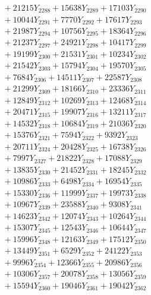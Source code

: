\documentclass[a4paper,10pt]{article}
\begin{document}
{\begin{align}
&\;  + 21215 Y_{2288} + 15638 Y_{2289} + 17103 Y_{2290} \\[0.3ex]
&\;  + 10044 Y_{2291} + 7770 Y_{2292} + 17617 Y_{2293} \\[0.3ex]
&\;  + 21987 Y_{2294} + 10756 Y_{2295} + 18364 Y_{2296} \\[0.3ex]
&\;  + 21237 Y_{2297} + 24921 Y_{2298} + 10417 Y_{2299} \\[0.3ex]
&\;  + 19199 Y_{2300} + 21531 Y_{2301} + 10234 Y_{2302} \\[0.3ex]
&\;  + 21542 Y_{2303} + 15794 Y_{2304} + 19570 Y_{2305} \\[0.3ex]
&\;  + 7684 Y_{2306} + 14511 Y_{2307} + 22587 Y_{2308} \\[0.5ex]\allowbreak
&\;  + 21299 Y_{2309} + 18166 Y_{2310} + 23336 Y_{2311} \\[0.3ex]
&\;  + 12849 Y_{2312} + 10269 Y_{2313} + 12468 Y_{2314} \\[0.3ex]
&\;  + 20471 Y_{2315} + 19907 Y_{2316} + 13211 Y_{2317} \\[0.3ex]
&\;  + 14532 Y_{2318} + 10684 Y_{2319} + 21036 Y_{2320} \\[0.3ex]
&\;  + 15376 Y_{2321} + 7594 Y_{2322} + 9392 Y_{2323} \\[0.3ex]
&\;  + 20711 Y_{2324} + 20428 Y_{2325} + 16738 Y_{2326} \\[0.3ex]
&\;  + 7997 Y_{2327} + 21822 Y_{2328} + 17088 Y_{2329} \\[0.3ex]
&\;  + 13835 Y_{2330} + 21452 Y_{2331} + 18245 Y_{2332} \\[0.3ex]
&\;  + 10986 Y_{2333} + 6498 Y_{2334} + 16954 Y_{2335} \\[0.3ex]
&\;  + 15330 Y_{2336} + 11999 Y_{2337} + 19973 Y_{2338} \\[0.5ex]\allowbreak
&\;  + 10967 Y_{2339} + 23588 Y_{2340} + 9308 Y_{2341} \\[0.3ex]
&\;  + 14623 Y_{2342} + 12074 Y_{2343} + 10264 Y_{2344} \\[0.3ex]
&\;  + 15307 Y_{2345} + 12543 Y_{2346} + 10644 Y_{2347} \\[0.3ex]
&\;  + 15996 Y_{2348} + 12163 Y_{2349} + 17512 Y_{2350} \\[0.3ex]
&\;  + 13449 Y_{2351} + 6529 Y_{2352} + 24122 Y_{2353} \\[0.3ex]
&\;  + 9996 Y_{2354} + 12366 Y_{2355} + 20986 Y_{2356} \\[0.3ex]
&\;  + 10306 Y_{2357} + 20078 Y_{2358} + 13056 Y_{2359} \\[0.3ex]
&\;  + 15594 Y_{2360} + 19046 Y_{2361} + 19042 Y_{2362} \\[0.3ex]

\end{align}}
\end{document}
